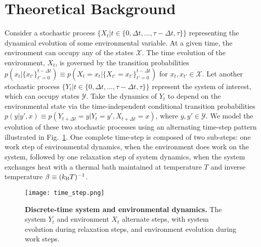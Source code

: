 \documentclass[entropy,article,
submit,
moreauthors,pdftex,10pt,a4paper]{mdpi}
\begin{document}
\section{Theoretical Background}
Consider a stochastic process $\{ X_{t} | t \in \{0,\Delta t, ..., \tau-\Delta t, \tau\}\}$ representing the dynamical evolution of some environmental variable. At a given time, the environment can occupy any of the states $\mathcal{X}$. The time evolution of the environment, $X_{t}$, is governed by the transition probabilities $p(x_t|\{ x_{t'} \}_{t'=0}^{t-\Delta t}) \equiv p(X_{t}=x_t| \{ X_{t'} = x_{t'} \}_{t'=0}^{t-\Delta t})$ for $x_t,x_{t'} \in \mathcal{X}$. 
Let another stochastic process $\{ Y_{t} | t \in \{0,\Delta t, ..., \tau-\Delta t, \tau\}\}$ represent the system of interest, which can occupy states $\mathcal{Y}$. Take the dynamics of $Y_{t}$ to depend on the environmental state via the time-independent conditional transition probabilities $p(y|y',x) \equiv p(Y_{t+\Delta t}=y|Y_{t}=y',X_{t+\Delta t}=x)$, where $y, y' \in \mathcal{Y}$.
We model the evolution of these two stochastic processes using an alternating time-step pattern illustrated in Fig.~\ref{fig:timestep}. One complete time-step is composed of two sub-steps: one work step of environmental dynamics, when the environment does work on the system, followed by one relaxation step of system dynamics, when the system exchanges heat with a thermal bath maintained at temperature $T$ and inverse temperature $\beta \equiv (k_{\rm B}T)^{-1}$. 

\begin{figure}[H]
\centering
\texttt{[image: time\_step.png]}
\caption{{\bf Discrete-time system and environmental dynamics.} 
The system $Y_t$ and environment $X_t$ alternate steps, with system evolution during relaxation steps, and environment evolution during work steps.}
\label{fig:timestep}
\end{figure}
\end{document}

